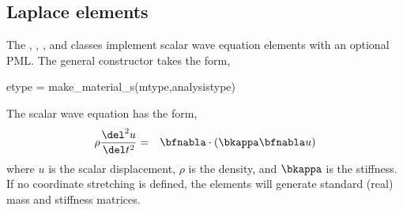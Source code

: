 \clearpage
\subsection{Laplace elements}

The , , , 
and 
classes implement scalar wave equation elements with an optional PML.
The general constructor takes the form,
\begin{codelist}
  \item[etype = make\_material\_s(mtype,analysistype)]
\end{codelist}

The scalar wave equation has the form,
\begin{eqnarray}
\rho \frac{\del^2 u}{\del t^2} &=& 
              \bfnabla\cdot \left( \bkappa \bfnabla u \right)
\end{eqnarray}
where $u$ is the scalar displacement, $\rho$ is the density, 
and $\bkappa$ is the stiffness. 
If no coordinate stretching is 
defined, the elements will generate standard (real) mass and 
stiffness matrices.

